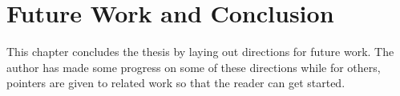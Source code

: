 
\chapter{Future Work and Conclusion}
\label{cha:future-work-concl}

This chapter concludes the thesis by laying out directions for future
work. The author has made some progress on some of these directions
while for others, pointers are given to related work so that the
reader can get started.





